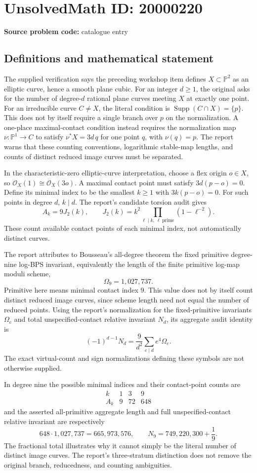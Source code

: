 \documentclass[11pt]{article}
\newcommand{\PP}{\mathbb{P}}
\begin{document}
\section*{UnsolvedMath ID: 20000220}
\textbf{Source problem code:} catalogue entry
\subsection{Definitions and mathematical statement}
The supplied verification says the preceding workshop item defines \(X\subset\PP^2\) as an elliptic curve, hence a smooth plane cubic. For an integer \(d\geq1\), the original asks for the number of degree-\(d\) rational plane curves meeting \(X\) at exactly one point. For an irreducible curve \(C\ne X\), the literal condition is \(\operatorname{Supp}(C\cap X)=\{p\}\). This does not by itself require a single branch over \(p\) on the normalization. A one-place maximal-contact condition instead requires the normalization map \(\nu:\PP^1\to C\) to satisfy \(\nu^*X=3d\,q\) for one point \(q\), with \(\nu(q)=p\). The report warns that these counting conventions, logarithmic stable-map lengths, and counts of distinct reduced image curves must be separated.

In the characteristic-zero elliptic-curve interpretation, choose a flex origin \(o\in X\), so \(\mathcal O_X(1)\cong\mathcal O_X(3o)\). A maximal contact point must satisfy \(3d(p-o)=0\). Define its minimal index to be the smallest \(k\geq1\) with \(3k(p-o)=0\). For such points in degree \(d\), \(k\mid d\). The report's candidate torsion audit gives
\[
A_k=9J_2(k),\qquad
J_2(k)=k^2\prod_{\ell\mid k,\ \ell\ \mathrm{prime}}(1-\ell^{-2}).
\]
These count available contact points of each minimal index, not automatically distinct curves.

The report attributes to Bousseau's all-degree theorem the fixed primitive degree-nine log-BPS invariant, equivalently the length of the finite primitive log-map moduli scheme,
\[
\Omega_9=1{,}027{,}737.
\]
Primitive here means minimal contact index \(9\). This value does not by itself count distinct reduced image curves, since scheme length need not equal the number of reduced points. Using the report's normalization for the fixed-primitive invariants \(\Omega_e\) and total unspecified-contact relative invariant \(N_d\), its aggregate audit identity is
\[
(-1)^{d-1}N_d=\frac9{d^2}\sum_{e\mid d}e^4\Omega_e.
\]
The exact virtual-count and sign normalizations defining these symbols are not otherwise supplied.

In degree nine the possible minimal indices and their contact-point counts are
\[
\begin{array}{c|ccc}
k&1&3&9\\\hline
A_k&9&72&648
\end{array}
\]
and the asserted all-primitive aggregate length and full unspecified-contact relative invariant are respectively
\[
648\cdot1{,}027{,}737=665{,}973{,}576,\qquad
N_9=749{,}220{,}300+\frac19.
\]
The fractional total illustrates why it cannot simply be the literal number of distinct image curves. The report's three-stratum distinction does not remove the original branch, reducedness, and counting ambiguities.
\end{document}
